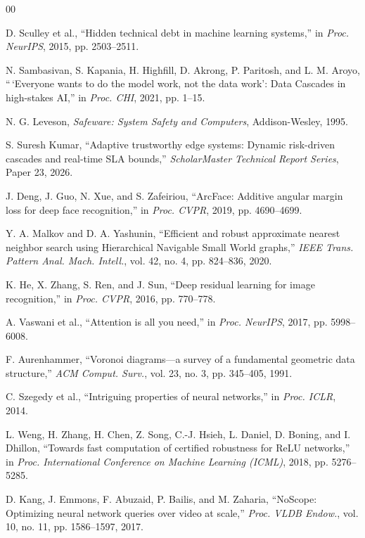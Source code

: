 \documentclass[conference]{IEEEtran}
\begin{document}
\begin{thebibliography}{00}
\small

 D. Sculley et al., ``Hidden technical debt in machine learning systems,'' in \emph{Proc. NeurIPS}, 2015, pp. 2503--2511.

 N. Sambasivan, S. Kapania, H. Highfill, D. Akrong, P. Paritosh, and L. M. Aroyo, ``\,`Everyone wants to do the model work, not the data work': Data Cascades in high-stakes AI,'' in \emph{Proc. CHI}, 2021, pp. 1--15.

 N. G. Leveson, \emph{Safeware: System Safety and Computers}, Addison-Wesley, 1995.

 S. Suresh Kumar, ``Adaptive trustworthy edge systems: Dynamic risk-driven cascades and real-time SLA bounds,'' \emph{ScholarMaster Technical Report Series}, Paper 23, 2026.

 J. Deng, J. Guo, N. Xue, and S. Zafeiriou, ``ArcFace: Additive angular margin loss for deep face recognition,'' in \emph{Proc. CVPR}, 2019, pp. 4690--4699.

 Y. A. Malkov and D. A. Yashunin, ``Efficient and robust approximate nearest neighbor search using Hierarchical Navigable Small World graphs,'' \emph{IEEE Trans. Pattern Anal. Mach. Intell.}, vol. 42, no. 4, pp. 824--836, 2020.

 K. He, X. Zhang, S. Ren, and J. Sun, ``Deep residual learning for image recognition,'' in \emph{Proc. CVPR}, 2016, pp. 770--778.

 A. Vaswani et al., ``Attention is all you need,'' in \emph{Proc. NeurIPS}, 2017, pp. 5998--6008.

 F. Aurenhammer, ``Voronoi diagrams---a survey of a fundamental geometric data structure,'' \emph{ACM Comput. Surv.}, vol. 23, no. 3, pp. 345--405, 1991.

 C. Szegedy et al., ``Intriguing properties of neural networks,'' in \emph{Proc. ICLR}, 2014.

 L. Weng, H. Zhang, H. Chen, Z. Song, C.-J. Hsieh, L. Daniel, D. Boning, and I. Dhillon, ``Towards fast computation of certified robustness for ReLU networks,'' in \emph{Proc. International Conference on Machine Learning (ICML)}, 2018, pp. 5276--5285.

 D. Kang, J. Emmons, F. Abuzaid, P. Bailis, and M. Zaharia, ``NoScope: Optimizing neural network queries over video at scale,'' \emph{Proc. VLDB Endow.}, vol. 10, no. 11, pp. 1586--1597, 2017.


\end{thebibliography}
\end{document}
